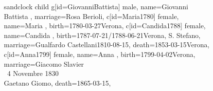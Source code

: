 \documentclass{article}
\begin{document}
\begin{figure}
\begin{minipage}[b]{0.19\textwidth}
    \begin{genealogypicture}[
        processing=database,
        database format=full,
        node size=3.5cm,
        level size=2.8cm,
        level distance=6mm,
        list separators hang=3mm,
        name font=\bfseries,
        surn code={\textcolor{black!50!black}{#1}},
        place text={\newline}{},
        date format=d month yyyy,
        tcbset={male/.style={colframe=blue,colback=blue!5},
        female/.style={colframe=red,colback=red!5}},
        box={fit basedim=7pt,boxsep=2pt,segmentation style=solid,
            halign=left,before upper=\parskip1pt,
            \gtrDBsex,
        },
    ]
    sandclock
    {
        child{
            g[id=GiovanniBattista] {
                male,
                name={Giovanni Battista },
                marriage={Rosa Berioli}{},
            }
            c[id=Maria1780]{
                female,
                name={Maria },
                birth={1780-03-27}{Verona},
            }
            c[id=Candida1788]{
                female,
                name={Candida },
                birth={1787-07-21/1788-06-21}{Verona, S. Stefano},
                marriage={Gualfardo Castellani}{1810-08-15},
                death={1853-03-15}{Verona},
            }
            c[id=Anna1799]{
                female,
                name={Anna },
                birth={1799-04-02}{Verona},
                marriage={Giacomo Slavier \\ \gtrsymMarried~4 Novembre 1830 \\ \hspace*{3mm} Gaetano Giomo}{},
                death={1865-03-15}{},
            }
        }
    }
    \end{genealogypicture}

\end{minipage}
\hfill
\begin{minipage}[b]{0.19\textwidth}
\centering


\end{minipage}
\end{figure}
\end{document}
